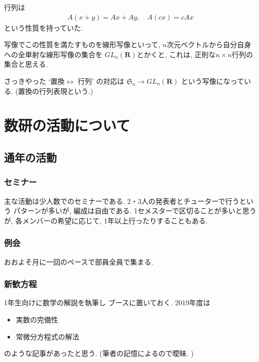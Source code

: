 \documentclass[11pt, a4paper, dvipdfmx]{jsarticle}
\theoremstyle{definition}
\theoremstyle{mystyle}
\numberwithin{equation}{section} %
\begin{document}
行列は
\begin{align*}
    A(x+y) = Ax + Ay, \quad A(cx) = cAx
\end{align*}
という性質を持っていた. 

写像でこの性質を満たすものを線形写像といって, 
$n$次元ベクトルから自分自身への全単射な線形写像の集合を 
$GL_n(\mathbf{R})$とかくと, 
これは, 正則な$n\times n$行列の集合と思える. 

さっきやった `置換$\longleftrightarrow$ 行列' の対応は
$\mathfrak{S}_n \to GL_n(\mathbf{R})$
という写像になっている. (置換の行列表現という.)

\section{数研の活動について}
\subsection*{通年の活動}

\subsubsection*{セミナー}
主な活動は少人数でのセミナーである. 
2・3人の発表者とチューターで行うという
パターンが多いが, 編成は自由である. 
1セメスターで区切ることが多いと思うが, 
各メンバーの希望に応じて, 
1年以上行ったりすることもある. 

\subsubsection*{例会}
おおよそ月に一回のペースで部員全員で集まる. 


\subsubsection*{新歓方程}
1年生向けに数学の解説を執筆し
ブースに置いておく. 
2019年度は
\begin{itemize}
    \item 実数の完備性
    \item 常微分方程式の解法
\end{itemize}
のような記事があったと思う. 
(筆者の記憶によるので曖昧. )
\end{document}
